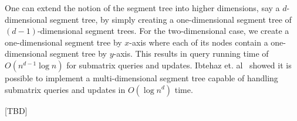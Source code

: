 One can extend the notion of the segment tree into higher dimensions, say a $d$-dimensional segment tree, by simply creating a one-dimensional segment tree of $(d-1)$-dimensional segment trees.  For the two-dimensional case, we create a one-dimensional segment tree by $x$-axis where each of its nodes contain a one-dimensional segment tree by $y$-axis. This results in query running time of $O(n^{d-1}\log{n})$ for submatrix queries and updates. Ibtehaz et. al~\cite{ibtehaz2018multidimensional} showed it is possible to implement a multi-dimensional segment tree capable of handling submatrix queries and updates in $O(\log{n}^d)$ time.

[TBD]